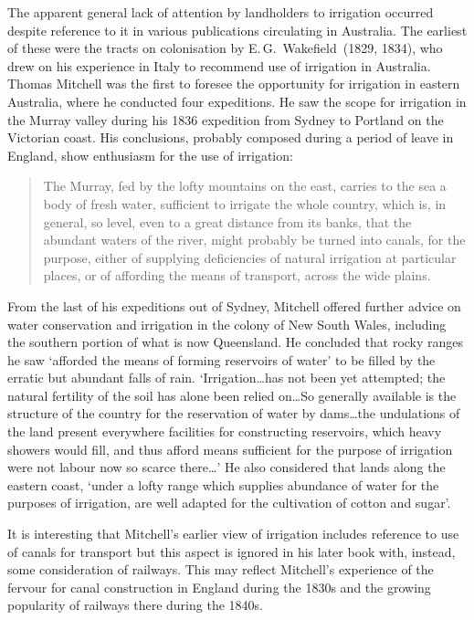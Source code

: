 The apparent general lack of attention by landholders to irrigation
occurred despite reference to it in various publications circulating
in Australia.  The earliest of these were the tracts on colonisation
by E.\,G.~Wakefield~(1829, 1834), who drew on his experience in Italy
to recommend use of irrigation in Australia.  Thomas Mitchell was the
first to foresee the opportunity for irrigation in eastern Australia,
where he conducted four expeditions.  He saw the scope for irrigation
in the Murray valley during his 1836 expedition from Sydney to
Portland on the Victorian coast. His conclusions, probably composed
during a period of leave in England, show enthusiasm for the use of
irrigation:
\begin{quote}
	The Murray, fed by the lofty mountains on the east, carries to
	the sea a body of fresh water, sufficient to irrigate the
	whole country, which is, in general, so level, even to a great
	distance from its banks, that the abundant waters of the
	river, might probably be turned into canals, for the purpose,
	either of supplying deficiencies of natural irrigation at
	particular places, or of affording the means of transport,
	across the wide plains.
\end{quote}

From the last of his expeditions out of Sydney, Mitchell offered
further advice on water conservation and irrigation in the colony of
New South Wales, including the southern portion of what is now
Queensland.  He concluded that rocky ranges he saw `afforded the means
of forming reservoirs of water' to be filled by the erratic but
abundant falls of rain.  `Irrigation\ldots has not been yet attempted;
the natural fertility of the soil has alone been relied on\ldots So
generally available is the structure of the country for the
reservation of water by dams\ldots the undulations of the land present
everywhere facilities for constructing reservoirs, which heavy showers
would fill, and thus afford means sufficient for the purpose of
irrigation were not labour now so scarce there\ldots' He also
considered that lands along the eastern coast, `under a lofty range
which supplies abundance of water for the purposes of irrigation, are
well adapted for the cultivation of cotton and
sugar'.

It is interesting that Mitchell's earlier view of irrigation includes
reference to use of canals for transport but this aspect is ignored in
his later book with, instead, some consideration of railways.  This may
reflect Mitchell's experience of the fervour for canal construction in
England during the 1830s and the growing popularity of railways there
during the 1840s.

